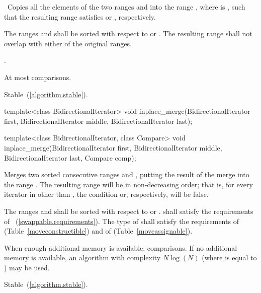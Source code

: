 \begin{itemdescr}
\pnum
\effects\ Copies all the elements of the two ranges  and
 into the range , where 
is , such that the resulting range satisfies
 or , respectively.

\pnum
\requires The ranges  and  shall be
sorted with respect to  or .
The resulting range shall not overlap with either of the original ranges.

\pnum
\returns
{}.

\pnum
\complexity
At most
comparisons.

\pnum
\remarks Stable~(\ref{algorithm.stable}).
\end{itemdescr}

%
\begin{itemdecl}
template<class BidirectionalIterator>
  void inplace_merge(BidirectionalIterator first,
                     BidirectionalIterator middle,
                     BidirectionalIterator last);

template<class BidirectionalIterator, class Compare>
  void inplace_merge(BidirectionalIterator first,
                     BidirectionalIterator middle,
                     BidirectionalIterator last, Compare comp);
\end{itemdecl}

\begin{itemdescr}
\pnum
\effects
Merges two sorted consecutive ranges
and
,
putting the result of the merge into the range
.
The resulting range will be in non-decreasing order;
that is, for every iterator
in
other than
,
the condition
or, respectively,
will be false.

\pnum
\requires
The ranges  and  shall be
sorted with respect to  or .
 shall satisfy the requirements of
~(\ref{swappable.requirements}). The type
of  shall satisfy the requirements of
 (Table~\ref{moveconstructible}) and of
 (Table~\ref{moveassignable}).


\pnum
\complexity
When enough additional memory is available,
comparisons.
If no additional memory is available, an algorithm with complexity
$N \log(N)$
(where
is equal to
)
may be used.

\pnum
\remarks Stable~(\ref{algorithm.stable}).
\end{itemdescr}

